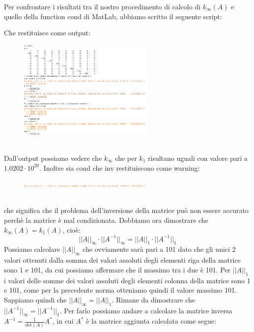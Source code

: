 \begin{flushleft}
Per confrontare i risultati tra il nostro procedimento di calcolo di $k_{\infty}(A)$ e quello della function cond di MatLab, abbiamo scritto il seguente script:

\newpage
Che restituisce come output:
\begin{figure}[h]
\includegraphics[left, width=250px]{cap_3/es15/es315}
\end{figure}
\newline \\
Dall'output possiamo vedere che $k_{\infty}$ che per $k_1$ risultano uguali con valore pari a $1.0202\cdot 10^{20}$. Inoltre sia cond che inv restituiscono come warning:
\begin{figure}[h]
\includegraphics[left, width=250px]{cap_3/es15/es315e}
\end{figure}
\newline \\
che significa che il problema dell'inversione della matrice può non essere accurato perchè la matrice è mal condizionata.
Dobbiamo ora dimostrare che $k_{\infty}(A)=k_{1}(A)$, cioè:
\[
\Big|\Big|A\Big|\Big|_{\infty} \cdot \Big|\Big|A^{-1}\Big|\Big|_{\infty} = \Big|\Big|A\Big|\Big|_{1} \cdot \Big|\Big|A^{-1}\Big|\Big|_{1}
\]
Possiamo calcolare $\Big|\Big|A\Big|\Big|_{\infty}$ che ovviamente sarà pari a 101 dato che gli unici 2 valori ottenuti dalla somma dei valori assoluti degli elementi riga della matrice sono 1 e 101, da cui possiamo affermare che il massimo tra i due è 101. Per $\Big|\Big|A\Big|\Big|_{1}$ i valori delle somme dei valori assoluti degli elementi colonna della matrice sono 1 e 101, come per la precedente norma otteniamo quindi il valore massimo 101. Sappiamo quindi che $\Big|\Big|A\Big|\Big|_{\infty}=\Big|\Big|A\Big|\Big|_{1}$. Rimane da dimostrare che $\Big|\Big|A^{-1}\Big|\Big|_{\infty} = \Big|\Big|A^{-1}\Big|\Big|_{1}$. Per farlo possiamo andare a calcolare la matrice inversa $A^{-1} = \frac{1}{\text{det}(A)}A^{*}$, in cui $A^*$ è la matrice aggiunta calcolata come segue:

\end{flushleft}
